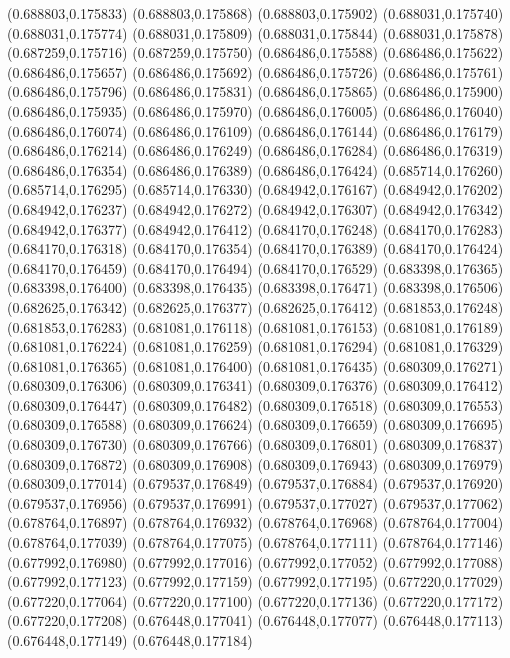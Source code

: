 (0.688803,0.175833)
(0.688803,0.175868)
(0.688803,0.175902)
(0.688031,0.175740)
(0.688031,0.175774)
(0.688031,0.175809)
(0.688031,0.175844)
(0.688031,0.175878)
(0.687259,0.175716)
(0.687259,0.175750)
(0.686486,0.175588)
(0.686486,0.175622)
(0.686486,0.175657)
(0.686486,0.175692)
(0.686486,0.175726)
(0.686486,0.175761)
(0.686486,0.175796)
(0.686486,0.175831)
(0.686486,0.175865)
(0.686486,0.175900)
(0.686486,0.175935)
(0.686486,0.175970)
(0.686486,0.176005)
(0.686486,0.176040)
(0.686486,0.176074)
(0.686486,0.176109)
(0.686486,0.176144)
(0.686486,0.176179)
(0.686486,0.176214)
(0.686486,0.176249)
(0.686486,0.176284)
(0.686486,0.176319)
(0.686486,0.176354)
(0.686486,0.176389)
(0.686486,0.176424)
(0.685714,0.176260)
(0.685714,0.176295)
(0.685714,0.176330)
(0.684942,0.176167)
(0.684942,0.176202)
(0.684942,0.176237)
(0.684942,0.176272)
(0.684942,0.176307)
(0.684942,0.176342)
(0.684942,0.176377)
(0.684942,0.176412)
(0.684170,0.176248)
(0.684170,0.176283)
(0.684170,0.176318)
(0.684170,0.176354)
(0.684170,0.176389)
(0.684170,0.176424)
(0.684170,0.176459)
(0.684170,0.176494)
(0.684170,0.176529)
(0.683398,0.176365)
(0.683398,0.176400)
(0.683398,0.176435)
(0.683398,0.176471)
(0.683398,0.176506)
(0.682625,0.176342)
(0.682625,0.176377)
(0.682625,0.176412)
(0.681853,0.176248)
(0.681853,0.176283)
(0.681081,0.176118)
(0.681081,0.176153)
(0.681081,0.176189)
(0.681081,0.176224)
(0.681081,0.176259)
(0.681081,0.176294)
(0.681081,0.176329)
(0.681081,0.176365)
(0.681081,0.176400)
(0.681081,0.176435)
(0.680309,0.176271)
(0.680309,0.176306)
(0.680309,0.176341)
(0.680309,0.176376)
(0.680309,0.176412)
(0.680309,0.176447)
(0.680309,0.176482)
(0.680309,0.176518)
(0.680309,0.176553)
(0.680309,0.176588)
(0.680309,0.176624)
(0.680309,0.176659)
(0.680309,0.176695)
(0.680309,0.176730)
(0.680309,0.176766)
(0.680309,0.176801)
(0.680309,0.176837)
(0.680309,0.176872)
(0.680309,0.176908)
(0.680309,0.176943)
(0.680309,0.176979)
(0.680309,0.177014)
(0.679537,0.176849)
(0.679537,0.176884)
(0.679537,0.176920)
(0.679537,0.176956)
(0.679537,0.176991)
(0.679537,0.177027)
(0.679537,0.177062)
(0.678764,0.176897)
(0.678764,0.176932)
(0.678764,0.176968)
(0.678764,0.177004)
(0.678764,0.177039)
(0.678764,0.177075)
(0.678764,0.177111)
(0.678764,0.177146)
(0.677992,0.176980)
(0.677992,0.177016)
(0.677992,0.177052)
(0.677992,0.177088)
(0.677992,0.177123)
(0.677992,0.177159)
(0.677992,0.177195)
(0.677220,0.177029)
(0.677220,0.177064)
(0.677220,0.177100)
(0.677220,0.177136)
(0.677220,0.177172)
(0.677220,0.177208)
(0.676448,0.177041)
(0.676448,0.177077)
(0.676448,0.177113)
(0.676448,0.177149)
(0.676448,0.177184)
